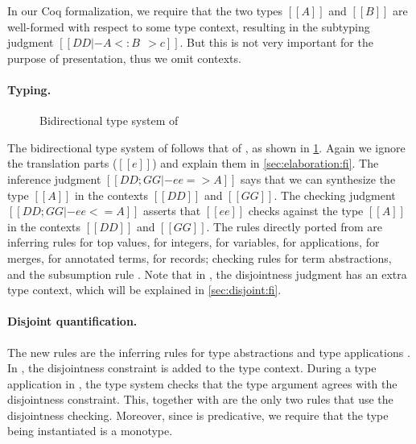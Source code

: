\begin{remark}
  In our Coq formalization, we require that the two types $[[A]]$ and $[[B]]$ are
  well-formed with respect to some type context, resulting in the subtyping
  judgment $[[DD |- A <: B ~~> c]]$. But this is not very important
  for the purpose of presentation, thus we omit contexts.
\end{remark}


\paragraph{Typing.}

\begin{figure}
  \centering
  \caption{Bidirectional type system of \fnamee}
  \label{fig:typing:fi}
\end{figure}


The bidirectional type system of \fnamee follows that of \fname, as shown
in \cref{fig:typing:fi}. Again we ignore the translation parts ($[[e]]$) and explain them in
\cref{sec:elaboration:fi}. The inference judgment $[[ DD; GG |- ee => A  ]]$
says that we can synthesize the type $[[A]]$ in the contexts $[[DD]]$ and $[[GG]]$. The checking judgment
$[[ DD ; GG |- ee <= A  ]]$ asserts that $[[ee]]$ checks against the type $[[A]]$
in the contexts $[[DD]]$ and $[[GG]]$. The rules directly ported from \namee are inferring rules  for top values,
 for integers,  for variables,  for applications,  for merges,
 for annotated terms,  for records; checking rules  for term abstractions, and
the subsumption rule . Note that in , the disjointness judgment has an extra type context, which will be
explained in \cref{sec:disjoint:fi}.

\paragraph{Disjoint quantification.}

The new rules are the inferring rules for type abstractions  and
type applications . In , the disjointness
constraint is added to the type context. During a type application in
, the type system checks that the type argument agrees with the
disjointness constraint. This, together with  are the only two
rules that use the disjointness checking. Moreover, since \fnamee is
predicative, we require that the type being instantiated is a monotype.



